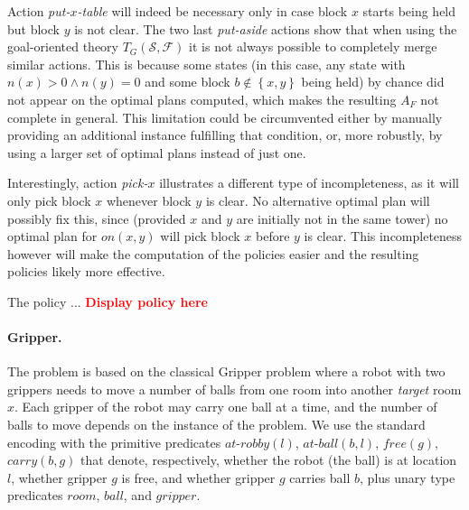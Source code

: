 \documentclass[letterpaper]{article} %
\newcommand{\set}[1]{\ensuremath{\left\{#1 \right\}}}
\newcommand{\alert}[1]{\textcolor{red}{\bf #1}}
\newcommand{\F}{\mathcal{F}}
\renewcommand{\S}{\mathcal{S}}
\begin{document}
{%
% 
% 
% 
% 
% 
% 

Action \emph{put-$x$-table} will indeed be necessary only in case block $x$ starts being held
but block $y$ is not clear.
%
The two last \emph{put-aside} actions show that when using the goal-oriented theory $T_G(\S,\F)$
it is not always possible to completely merge similar actions.
This is because some states (in this case, any state with $n(x) > 0 \land n(y) = 0$ and some block $b \not\in \set{x,y}$ being held)
by chance did not appear on the optimal plans computed, which makes the resulting $A_F$ not complete in general.
This limitation could be circumvented either by manually providing an additional 
instance fulfilling that condition, or, more robustly, by using a larger set of optimal plans instead of just one.

Interestingly, action \emph{pick-$x$} illustrates a different type of incompleteness, as it will
only pick block $x$ whenever block $y$ is clear. No alternative optimal plan will possibly fix this,
since (provided $x$ and $y$ are initially not in the same tower) no optimal plan for $on(x,y)$ will pick block $x$ before $y$ is clear.
This incompleteness however will make the computation of the policies easier and the resulting policies likely more effective.


The policy ...
\alert{Display policy here}
}


\paragraph{Gripper.}
The problem is based on the classical Gripper problem where a robot with
two grippers needs to move a number of balls from one room into another
\emph{target} room $x$. Each gripper of the robot may carry one ball 
at a time, and the number of balls to move depends on the instance of
the problem.
We use the standard encoding with the primitive predicates $at\text{-}robby(l)$,
$at\text{-}ball(b, l)$, $free(g)$, $carry(b, g)$ that denote, respectively,
whether the robot (the ball) is at location $l$, whether gripper $g$ is free,
and whether gripper $g$ carries ball $b$, plus unary type predicates $room$,
$ball$, and $gripper$.
\end{document}
